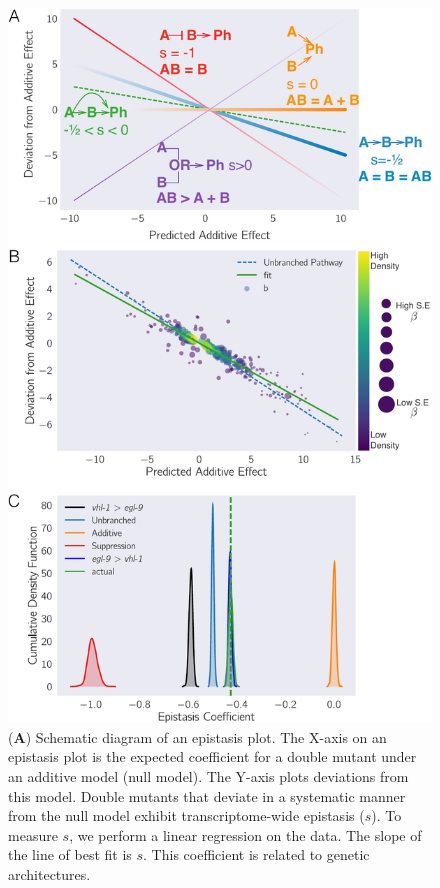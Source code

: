 \documentclass[9pt,twocolumn,twoside]{pnas-new}
\begin{document}
\begin{figure}[tbhp]
\centering
\includegraphics[width=\linewidth]{figs/egl9hif1-epistasis.pdf}
\caption{
(\textbf{A}) Schematic diagram of an epistasis plot. The X-axis on an epistasis
plot is the expected coefficient for a double mutant under an additive model
(null model). The Y-axis plots deviations from this model. Double mutants that
deviate in a systematic manner from the null model exhibit transcriptome-wide epistasis
($s$). To measure $s$, we perform a linear regression on the data. The slope of
the line of best fit is $s$. This coefficient is related to genetic architectures.
}
\end{figure}
\end{document}
